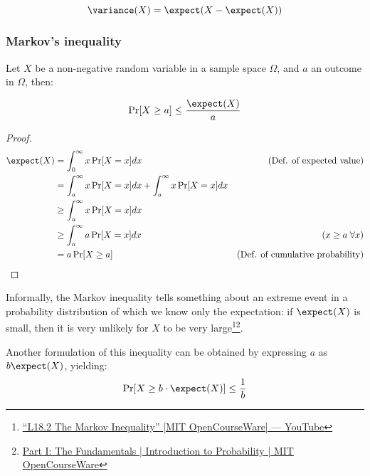 \[
    \variance(X) = \expect(X - \expect(X))
\]

\subsubsection{Markov's inequality}
	
Let $X$ be a non-negative random variable in a sample space $\Omega$, and $a$ an outcome in $\Omega$, then:

\begin{equation}\label{eq:markov}
    \Pr[X \geq a] \leq \frac{\expect(X)}{a}
\end{equation}

\begin{proof}
    \begin{align*}
        \expect(X) &= \int_{0}^{\infty} x \Pr[X = x]dx    & \text{(Def. of expected value)}         & \\
                   &= \int_{a}^{\infty} x \Pr[X = x]dx + \int_{a}^{\infty} x \Pr[X = x]dx &         & \\
                   &\geq \int_{a}^{\infty} x \Pr[X = x]dx &                                         & \\
                   &\geq \int_{a}^{\infty} a \Pr[X = x]dx & \text{($x \geq a \;\forall x$)}         & \\
                   &= a \Pr[X \geq a]                     & \text{(Def. of cumulative probability)} & \qedhere\\
    \end{align*}
\end{proof}

Informally, the Markov inequality tells something about an extreme event in a probability distribution of which we know only the expectation: if $\expect(X)$ is small, then it is very unlikely for $X$ to be very large\footnote{\linkicon \href{https://youtu.be/vjYanZ1nsZg}{\textsf{``L18.2 The Markov Inequality'' [MIT OpenCourseWare] --- YouTube}}}\footnote{\linkicon \href{https://ocw.mit.edu/resources/res-6-012-introduction-to-probability-spring-2018/part-i-the-fundamentals/}{\textsf{Part I: The Fundamentals | Introduction to Probability | MIT OpenCourseWare}}}.

Another formulation of this inequality can be obtained by expressing $a$ as $b \expect(X)$, yielding:
\begin{equation}\label{eq:markov2}
    \Pr[X \geq b \cdot \expect(X)] \leq \frac{1}{b}
\end{equation}


